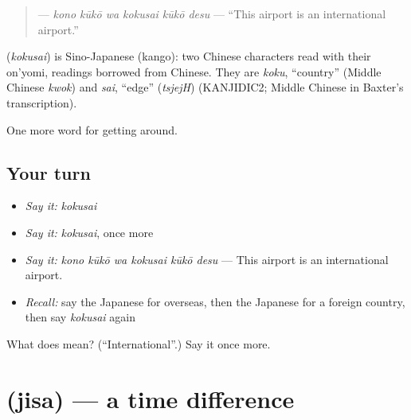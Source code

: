 \begin{quote}
\textbf{   } — \emph{kono kūkō wa kokusai kūkō desu} — \textquotedblleft{}This airport is an international airport.\textquotedblright{}
\end{quote}

\begin{cousinweb}
\textbf{} (\emph{kokusai}) is Sino-Japanese (kango): two Chinese characters read with their on'yomi, readings borrowed from Chinese. They are \emph{koku}, \textquotedblleft{}country\textquotedblright{} (Middle Chinese \emph{kwok}) and \emph{sai}, \textquotedblleft{}edge\textquotedblright{} (\emph{tsjejH}) (KANJIDIC2; Middle Chinese in Baxter's transcription).
\end{cousinweb}

\begin{grammarlens}[title={What you've built}]
One more word for getting around.
\end{grammarlens}

\subsection*{Your turn}
\begin{itemize}
\raggedright
  \item \emph{Say it:} \emph{kokusai}
  \item \emph{Say it:} \emph{kokusai}, once more
  \item \emph{Say it:} \emph{kono kūkō wa kokusai kūkō desu} — This airport is an international airport.
  \item \emph{Recall:} say the Japanese for overseas, then the Japanese for a foreign country, then say \emph{kokusai} again
\end{itemize}

\begin{tcolorbox}[breakable,colback=teal!4,colframe=teal!35!black,title={Before you move on}]
What does  mean? (\textquotedblleft{}International\textquotedblright{}.) Say it once more.
\end{tcolorbox}
\section[\texorpdfstring{\ja{じさ} (jisa)}{じさ (jisa)}]{ (jisa) — a time difference}

\label{lesson:JA-C385-jisa}



